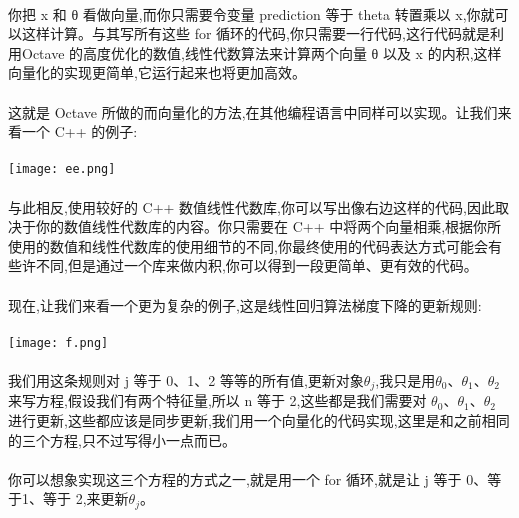 \documentclass{article}
\begin{document}
\begin{CJK}{UTF8}{gbsn}
\paragraph{}
你把 x 和 θ 看做向量,而你只需要令变量 prediction 等于 theta 转置乘以 x,你就可以这样计算。与其写所有这些 for 循环的代码,你只需要一行代码,这行代码就是利用Octave 的高度优化的数值,线性代数算法来计算两个向量 θ 以及 x 的内积,这样向量化的实现更简单,它运行起来也将更加高效。
\paragraph{}
这就是 Octave 所做的而向量化的方法,在其他编程语言中同样可以实现。让我们来看一个 C++ 的例子:
\paragraph{}
\texttt{[image: ee.png]}
\paragraph{}
与此相反,使用较好的 C++ 数值线性代数库,你可以写出像右边这样的代码,因此取决于你的数值线性代数库的内容。你只需要在 C++ 中将两个向量相乘,根据你所使用的数值和线性代数库的使用细节的不同,你最终使用的代码表达方式可能会有些许不同,但是通过一个库来做内积,你可以得到一段更简单、更有效的代码。
\paragraph{}
现在,让我们来看一个更为复杂的例子,这是线性回归算法梯度下降的更新规则:
\paragraph{}
\texttt{[image: f.png]}
\paragraph{}
我们用这条规则对 j 等于 0、1、2 等等的所有值,更新对象$\theta_{j}$,我只是用$\theta_{0}$、$\theta_{1}$、$\theta_{2}$来写方程,假设我们有两个特征量,所以 n 等于 2,这些都是我们需要对 $\theta_{0}$、$\theta_{1}$、$\theta_{2}$ 进行更新,这些都应该是同步更新,我们用一个向量化的代码实现,这里是和之前相同的三个方程,只不过写得小一点而已。
\paragraph{}
你可以想象实现这三个方程的方式之一,就是用一个 for 循环,就是让 j 等于 0、等于1、等于 2,来更新$\theta_{j}$。

\end{CJK}
\end{document}
